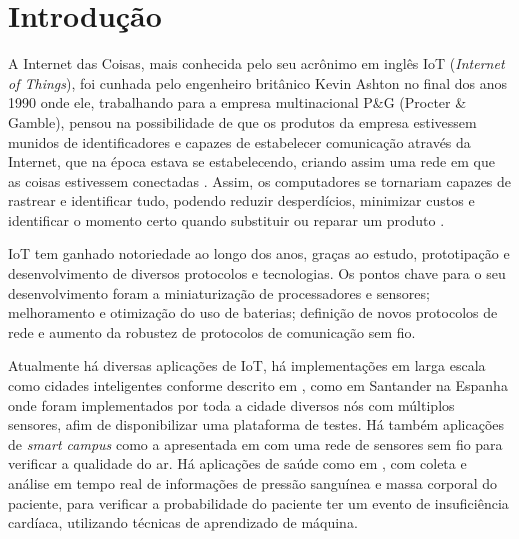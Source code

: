 \chapter[Introdução]{Introdução}
\label{cap:intro}

A Internet das Coisas, mais conhecida pelo seu acrônimo em inglês IoT (\emph{Internet of Things}), foi cunhada pelo engenheiro britânico Kevin Ashton no final dos anos 1990 onde ele, trabalhando para a empresa multinacional P\&G (Procter \& Gamble), pensou na possibilidade de que os produtos da empresa estivessem munidos de identificadores e capazes de estabelecer comunicação através da Internet, que na época estava se estabelecendo, criando assim uma rede em que as coisas estivessem conectadas \cite{KA_IOT}. Assim, os computadores se tornariam capazes de rastrear e identificar tudo, podendo reduzir desperdícios, minimizar custos e identificar o momento certo quando substituir ou reparar um produto \cite{lopezIOT}.

IoT tem ganhado notoriedade ao longo dos anos, graças ao estudo, prototipação e desenvolvimento de diversos protocolos e tecnologias. Os pontos chave para o seu desenvolvimento foram a miniaturização de processadores e sensores; melhoramento e otimização do uso de baterias; definição de novos protocolos de rede e aumento da robustez de protocolos de comunicação sem fio.


Atualmente há diversas aplicações de IoT, há implementações em larga escala como cidades inteligentes conforme descrito em \cite{sotres2017practical}, como em Santander na Espanha onde foram implementados por toda a cidade diversos nós com múltiplos sensores, afim de disponibilizar uma plataforma de testes. Há também aplicações de \emph{smart campus} como a apresentada em \cite{wang2017performance} com uma rede de sensores sem fio para verificar a qualidade do ar. Há aplicações de saúde como em \cite{zhang2015remote}, com coleta e análise em tempo real de informações de pressão sanguínea e massa corporal do paciente, para verificar a probabilidade do paciente ter um evento de insuficiência cardíaca, utilizando técnicas de aprendizado de máquina.

